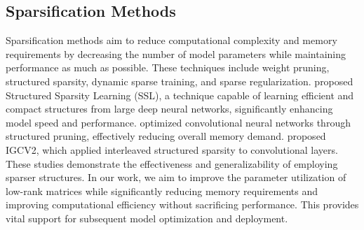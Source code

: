 \subsection{Sparsification Methods}
Sparsification methods aim to reduce computational complexity and memory requirements by decreasing the number of model parameters while maintaining performance as much as possible. These techniques include weight pruning, structured sparsity, dynamic sparse training, and sparse regularization. \citet{Wen_NIPS2016} proposed Structured Sparsity Learning (SSL), a technique capable of learning efficient and compact structures from large deep neural networks, significantly enhancing model speed and performance. \citet{anwar2015structuredpruningdeepconvolutional} optimized convolutional neural networks through structured pruning, effectively reducing overall memory demand. \citet{xie2018igcv2interleavedstructuredsparse} proposed IGCV2, which applied interleaved structured sparsity to convolutional layers. These studies demonstrate the effectiveness and generalizability of employing sparser structures. In our work, we aim to improve the parameter utilization of low-rank matrices while significantly reducing memory requirements and improving computational efficiency without sacrificing performance. This provides vital support for subsequent model optimization and deployment.

%